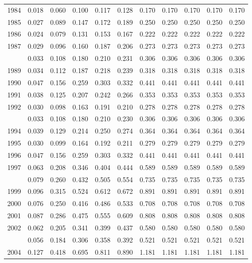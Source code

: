 \documentclass[
]{article}
\begin{document}
\begin{longtable}[t]{lrrrrrrrrrr}
1984 & 0.018 & 0.060 & 0.100 & 0.117 & 0.128 & 0.170 & 0.170 & 0.170 & 0.170 & 0.170\\
1985 & 0.027 & 0.089 & 0.147 & 0.172 & 0.189 & 0.250 & 0.250 & 0.250 & 0.250 & 0.250\\
1986 & 0.024 & 0.079 & 0.131 & 0.153 & 0.167 & 0.222 & 0.222 & 0.222 & 0.222 & 0.222\\
1987 & 0.029 & 0.096 & 0.160 & 0.187 & 0.206 & 0.273 & 0.273 & 0.273 & 0.273 & 0.273\\
\addlinespace
1988 & 0.033 & 0.108 & 0.180 & 0.210 & 0.231 & 0.306 & 0.306 & 0.306 & 0.306 & 0.306\\
1989 & 0.034 & 0.112 & 0.187 & 0.218 & 0.239 & 0.318 & 0.318 & 0.318 & 0.318 & 0.318\\
1990 & 0.047 & 0.156 & 0.259 & 0.303 & 0.332 & 0.441 & 0.441 & 0.441 & 0.441 & 0.441\\
1991 & 0.038 & 0.125 & 0.207 & 0.242 & 0.266 & 0.353 & 0.353 & 0.353 & 0.353 & 0.353\\
1992 & 0.030 & 0.098 & 0.163 & 0.191 & 0.210 & 0.278 & 0.278 & 0.278 & 0.278 & 0.278\\
\addlinespace
1993 & 0.033 & 0.108 & 0.180 & 0.210 & 0.230 & 0.306 & 0.306 & 0.306 & 0.306 & 0.306\\
1994 & 0.039 & 0.129 & 0.214 & 0.250 & 0.274 & 0.364 & 0.364 & 0.364 & 0.364 & 0.364\\
1995 & 0.030 & 0.099 & 0.164 & 0.192 & 0.211 & 0.279 & 0.279 & 0.279 & 0.279 & 0.279\\
1996 & 0.047 & 0.156 & 0.259 & 0.303 & 0.332 & 0.441 & 0.441 & 0.441 & 0.441 & 0.441\\
1997 & 0.063 & 0.208 & 0.346 & 0.404 & 0.444 & 0.589 & 0.589 & 0.589 & 0.589 & 0.589\\
\addlinespace
1998 & 0.079 & 0.260 & 0.432 & 0.505 & 0.554 & 0.735 & 0.735 & 0.735 & 0.735 & 0.735\\
1999 & 0.096 & 0.315 & 0.524 & 0.612 & 0.672 & 0.891 & 0.891 & 0.891 & 0.891 & 0.891\\
2000 & 0.076 & 0.250 & 0.416 & 0.486 & 0.533 & 0.708 & 0.708 & 0.708 & 0.708 & 0.708\\
2001 & 0.087 & 0.286 & 0.475 & 0.555 & 0.609 & 0.808 & 0.808 & 0.808 & 0.808 & 0.808\\
2002 & 0.062 & 0.205 & 0.341 & 0.399 & 0.437 & 0.580 & 0.580 & 0.580 & 0.580 & 0.580\\
\addlinespace
2003 & 0.056 & 0.184 & 0.306 & 0.358 & 0.392 & 0.521 & 0.521 & 0.521 & 0.521 & 0.521\\
2004 & 0.127 & 0.418 & 0.695 & 0.811 & 0.890 & 1.181 & 1.181 & 1.181 & 1.181 & 1.181\\

\end{longtable}
\end{document}
